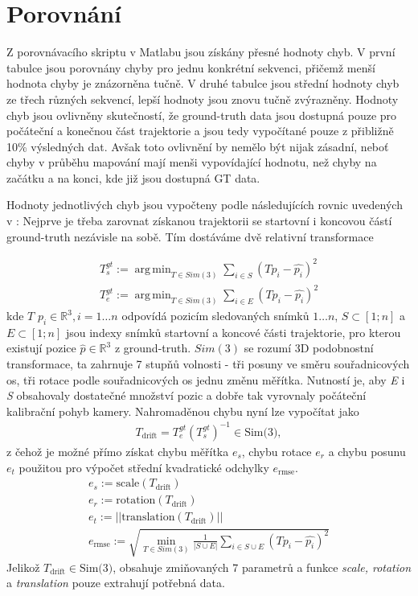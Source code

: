 \documentclass[12pt,a4paper]{report}
\DeclareMathOperator*{\argmin}{arg\,min}
\begin{document}
\section{Porovnání} \label{porovnani}
Z porovnávacího skriptu v Matlabu jsou získány přesné hodnoty chyb. V první tabulce jsou porovnány chyby pro jednu konkrétní sekvenci, přičemž menší hodnota chyby je znázorněna tučně. V druhé tabulce jsou střední hodnoty chyb ze třech různých sekvencí, lepší hodnoty jsou znovu tučně zvýrazněny. Hodnoty chyb jsou ovlivněny skutečností, že ground-truth data jsou dostupná pouze pro počáteční a konečnou část trajektorie a jsou tedy vypočítané pouze z přibližně 10\% výsledných dat. Avšak toto ovlivnění by nemělo být nijak zásadní, neboť chyby v průběhu mapování mají menši vypovídající hodnotu, než chyby na začátku a na konci, kde již jsou dostupná GT data. 

Hodnoty jednotlivých chyb jsou vypočteny podle následujících rovnic uvedených v \cite{benchmark}:
Nejprve je třeba zarovnat získanou trajektorii se startovní i koncovou částí ground-truth nezávisle na sobě. Tím dostáváme dvě relativní transformace

\begin{eqnarray*}
T^{gt}_s := \argmin_{T \in Sim(3)} \sum_{i \in S} (Tp_i- \hat{p_i})^2 \\
T^{gt}_e := \argmin_{T \in Sim(3)} \sum_{i \in E} (Tp_i- \hat{p_i})^2
\end{eqnarray*}
kde \(T\) \(p_i \in \mathbb{R}^3, i=1 \dots n \) odpovídá pozicím sledovaných snímků \(1 \dots n\), \(S \subset [1;n]\) a \(E \subset [1;n]\) jsou indexy snímků startovní a koncové části trajektorie, pro kterou existují pozice \(\hat{p} \in \mathbb{R}^3\) z ground-truth. \(Sim(3)\) se rozumí 3D podobnostní transformace, ta zahrnuje 7 stupňů volnosti - tři posuny ve směru souřadnicových os, tři rotace podle souřadnicových os jednu změnu měřítka. Nutností je, aby \textit{E} i \textit{S} obsahovaly dostatečné množství pozic a dobře tak vyrovnaly počáteční  kalibrační pohyb kamery. Nahromaděnou chybu nyní lze vypočítat jako 
\begin{eqnarray*} 
T_{\text{drift}}=T^{gt}_e(T^{gt}_s)^{-1} \in \text{Sim(3)},
\end{eqnarray*}
z čehož je možné přímo získat chybu měřítka \(e_s\), chybu rotace \(e_r\) a chybu posunu \(e_t\) použitou pro výpočet střední kvadratické odchylky \(e_{\text{rmse}}\).
\begin{gather}
e_s:=\text{scale}(T_{\text{drift}}) \label{es} \\
e_r:=\text{rotation}(T_{\text{drift}}) \label{er}\\
e_t:=||\text{translation}(T_{\text{drift}})|| \nonumber \\
e_{\text{rmse}}:=\sqrt{\min_{T \in Sim(3)} \frac{1}{|S \cup E|} \sum_{i \in S \cup E} (Tp_i-\hat{p_i})^2} \label{ermse}
\end{gather}
Jelikož \(T_{\text{drift}} \in \text{Sim(3)}\), obsahuje zmiňovaných 7 parametrů a funkce \textit{scale, rotation} a \textit{translation} pouze extrahují potřebná data.
\end{document}
